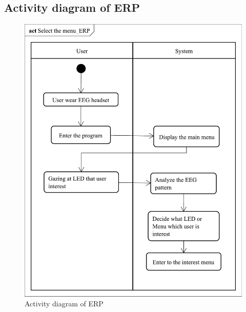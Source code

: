 \subsection{Activity diagram of ERP}
\begin{figure}[ht]
	\centering
	\includegraphics[scale = 0.295]{chapter4/av_ERP.pdf}
	\caption{Activity diagram of ERP}
\end{figure}

\newpage
